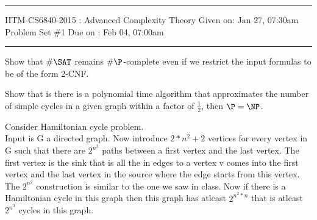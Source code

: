 \documentclass[12pt]{exam}
\begin{document}
\hrule
\vspace{3mm}
\noindent
{\sf IITM-CS6840-2015 : Advanced Complexity Theory  \hfill Given on: Jan 27, 07:30am}
\vspace{3mm} \\
\noindent
{\sf Problem Set \#1 \hfill Due on : Feb 04, 07:00am}
\vspace{3mm}
\hrule

\begin{questions}



\question[10]
Show that $\#\SAT$ remains $\#\P$-complete even if we restrict the input formulas to be of the form 2-CNF.

\question[10]
Show that is there is a polynomial time algorithm that approximates the number of
simple cycles in a given graph within a factor of $\frac{1}{2}$, then $\P = \NP$.
\begin{solution}
Consider Hamiltonian cycle problem.\\
Input is G a directed graph. Now introduce $2*n^2+2$ vertices for every vertex in G
such that there are $2^{n^2}$ paths between a first vertex and the last vertex.
The first vertex is the sink that is all the in edges to a vertex v comes into
the first vertex and the last vertex in the source where the edge starts from
this vertex. The $2^{n^2}$ construction is similar to the one we saw in class.
Now if there is a Hamiltonian cycle in this graph then this graph has atleast
$2^{n^2*n}$ that is atleast $2^{n^3}$ cycles in this graph.\\


\end{solution}
\end{questions}
\end{document}
